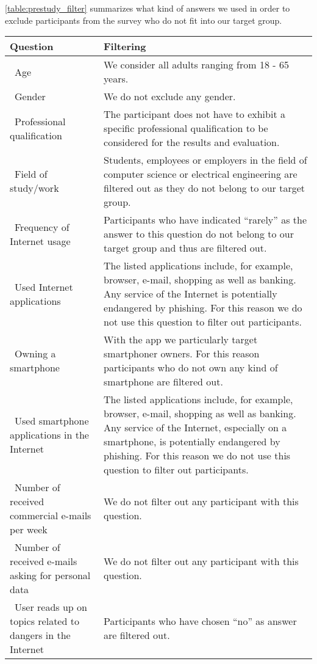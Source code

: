\autoref{table:prestudy_filter} summarizes what kind of answers we used in order to exclude participants from the survey who do not fit into our target group.
\begin{table}[hHtbp]
\centering
    \begin{tabular}{ | p{5cm} | p{10cm} |}
    \hline\textbf{Question} & \textbf{Filtering}  \\  \hline
		\hline\  Age & We consider all adults ranging from 18 - 65 years.
 \\
    \hline\  Gender & We do not exclude any gender.
 \\ 
    \hline\  Professional qualification & The participant does not have to exhibit a specific professional qualification to be considered for the results and evaluation.
 \\ 
		\hline\  Field of study/work & Students, employees or employers in the field of computer science or electrical engineering are filtered out as they do not belong to our target group.
 \\ 
	  \hline\ Frequency of Internet usage & Participants who have indicated ``rarely'' as the answer to this question do not belong to our target group and thus are filtered out.
 \\ 
	  \hline\ Used Internet applications  &  The listed applications include, for example, browser, e-mail, shopping as well as banking.
 Any service of the Internet is potentially endangered by phishing.
 For this reason we do not use this question to filter out participants.
\\ 
    \hline\ Owning a smartphone  & With the app we particularly target smartphoner owners.
 For this reason participants who do not own any kind of smartphone are filtered out.
 \\
		\hline\ Used smartphone applications in the Internet  & The listed applications include, for example, browser, e-mail, shopping as well as banking.
 Any service of the Internet, especially on a smartphone, is potentially endangered by phishing.
 For this reason we do not use this question to filter out participants.
 \\
    \hline\ Number of received commercial e-mails per week  & We do not filter out any participant with this question.
 \\
    \hline\ Number of received e-mails asking for personal data  & We do not filter out any participant with this question.
 \\
    \hline\ User reads up on topics related to dangers in the Internet  &  Participants who have chosen ``no'' as answer are filtered out.

\end{tabular}
\end{table}
